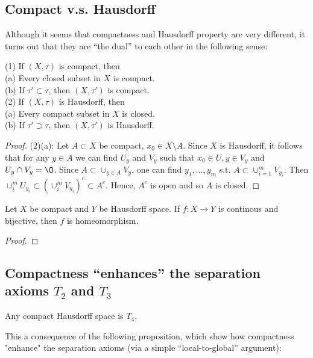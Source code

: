 \subsection{Compact v.s. Hausdorff}
Although it seems that compactness and Hausdorff property are very different, it
turns out that they are “the dual” to each other in the following sense:

\begin{proposition}{}{}
    (1) If $(X,\tau)$ is compact, then\\
    (a) Every closed subset in $X$ is compact.\\
    (b) If $\tau'\subset \tau$, then $(X,\tau')$ is compact.\\
    (2) If $(X,\tau)$ is Hausdorff, then\\
    (a) Every compact subset in $X$ is closed.\\
    (b) If $\tau'\supset \tau$, then $(X,\tau')$ is Hausdorff.
\end{proposition}

\begin{proof}
    (2)(a): Let $A\subset X$ be compact, $x_0\in X\setminus A$. Since $X$ is Hausdorff, it follows that for any $y\in A$ 
    we can find $U_y$ and $V_y$ such that $x_0\in U,y\in V_y$ and $U_y\cap V_y=\O$. Since $A\subset \cup_{y\in A} V_y$, 
    one can find $y_1,...,y_m$ s.t. $A\subset \cup_{i=1}^{m} V_{y_i}$.
    Then $\cup_{i}^{m}U_{y_i}\subset (\cup_{i}^{m} V_{y_i})^c\subset A^c$. 
    Hence, $A^c$ is open and so $A$ is closed.
\end{proof}

\begin{theorem}{}{}
    Let $X$ be compact and $Y$ be Hausdorff space. 
    If $f:X\rightarrow Y$ is continous and bijective, then
    $f$ is homeomorphism.
\end{theorem}

\begin{proof}
    
\end{proof}

\subsection{Compactness “enhances” the separation axioms $T_2$ and $T_3$}

\begin{theorem}{}{}
    Any compact Hausdorff space is $T_4$.
\end{theorem}
This a consequence of the following proposition, which show how compactness "enhance"
the separation axioms (via a simple “local-to-global” argument):

